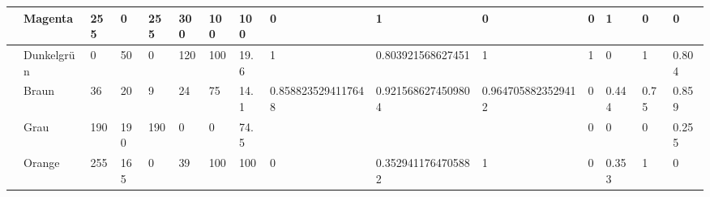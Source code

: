\begin{table}[!ht]
{\begin{tabular}{|l|l|l|l|l|l|l|l|l|l|l|l|l|l|l|}
			\cellcolor[HTML]{FF00FF} & Magenta & 255 & 0 & 255 & 300 & 100 & 100 & 0 & 1 & 0 & 0 & 1 & 0 & 0 \\ \hline
			\cellcolor[HTML]{003200} & Dunkelgrün & 0 & 50 & 0 & 120 & 100 & 19.6 & 1 & 0.803921568627451 & 1 & 1 & 0 & 1 & 0.804 \\ \hline
			\cellcolor[HTML]{241409} & Braun & 36 & 20 & 9 & 24 & 75 & 14.1 & 0.8588235294117648 & 0.9215686274509804 & 0.9647058823529412 & 0 & 0.444 & 0.75 & 0.859 \\ \hline
			\cellcolor[HTML]{BEBEBE} & Grau & 190 & 190 & 190 & 0 & 0 & 74.5 &  &  &  & 0 & 0 & 0 & 0.255 \\ \hline
			\cellcolor[HTML]{FFA500} & Orange & 255 & 165 & 0 & 39 & 100 & 100 & 0 & 0.3529411764705882 & 1 & 0 & 0.353 & 1 & 0 \\ \hline
		\end{tabular}}
	\end{table}
